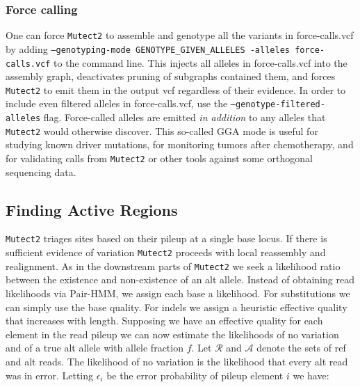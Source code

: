\documentclass[nofootinbib,amssymb,amsmath]{revtex4}
\newcommand{\code}[1]{\texttt{#1}}
\begin{document}
\subsubsection{Force calling}
One can force \code{Mutect2} to assemble and genotype all the variants in force-calls.vcf by adding \code{--genotyping-mode GENOTYPE\_GIVEN\_ALLELES -alleles force-calls.vcf} to the command line.  This injects all alleles in force-calls.vcf into the assembly graph, deactivates pruning of subgraphs contained them, and forces \code{Mutect2} to emit them in the output vcf regardless of their evidence.  In order to include even filtered alleles in force-calls.vcf, use the \code{--genotype-filtered-alleles} flag.  Force-called alleles are emitted \textit{in addition} to any alleles that \code{Mutect2} would otherwise discover.  This so-called GGA mode is useful for studying known driver mutations, for monitoring tumors after chemotherapy, and for validating calls from \code{Mutect2} or other tools against some orthogonal sequencing data.

\subsection{Finding Active Regions}
\code{Mutect2} triages sites based on their pileup at a single base locus.  If there is sufficient evidence of variation \code{Mutect2} proceeds with local reassembly and realignment.  As in the downstream parts of \code{Mutect2} we seek a likelihood ratio between the existence and non-existence of an alt allele.  Instead of obtaining read likelihoods via Pair-HMM, we assign each base a likelihood.  For substitutions we can simply use the base quality.  For indels we assign a heuristic effective quality that increases with length.  Supposing we have an effective quality for each element in the read pileup we can now estimate the likelihoods of no variation and of a true alt allele with allele fraction $f$.  Let $\mathcal{R}$ and $\mathcal{A}$ denote the sets of ref and alt reads.  The likelihood of no variation is the likelihood that every alt read was in error.  Letting $\epsilon_i$ be the error probability of pileup element $i$ we have:
\end{document}
